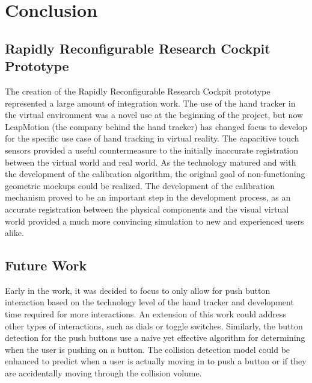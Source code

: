 \chapter{Conclusion}
\label{chap:conclusion}

\section{Rapidly Reconfigurable Research Cockpit Prototype}

The creation of the Rapidly Reconfigurable Research Cockpit prototype represented a large amount of integration work.
The use of the hand tracker in the virtual environment was a novel use at the beginning of the project, but now LeapMotion (the company behind the hand tracker) has changed focus to develop for the specific use case of hand tracking in virtual reality.
The capacitive touch sensors provided a useful countermeasure to the initially inaccurate registration between the virtual world and real world.
As the technology matured and with the development of the calibration algorithm, the original goal of non-functioning geometric mockups could be realized.
The development of the calibration mechanism proved to be an important step in the development process, as an accurate registration between the physical components and the visual virtual world provided a much more convincing simulation to new and experienced users alike.

\section{Future Work}


Early in the work, it was decided to focus to only allow for push button interaction based on the technology level of the hand tracker and development time required for more interactions.
An extension of this work could address other types of interactions, such as dials or toggle switches.
Similarly, the button detection for the push buttons use a naive yet effective algorithm for determining when the user is pushing on a button.
The collision detection model could be enhanced to predict when a user is actually moving in to push a button or if they are accidentally moving through the collision volume.

